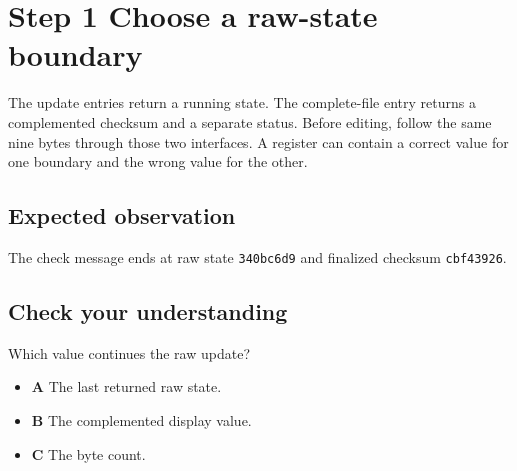 \section{Step 1 Choose a raw-state boundary}\label{crc-s01}

The update entries return a running state. The complete-file entry returns a complemented checksum and a separate status. Before editing, follow the same nine bytes through those two interfaces. A register can contain a correct value for one boundary and the wrong value for the other.

\subsection{Expected observation}
The check message ends at raw state \texttt{340bc6d9} and finalized checksum \texttt{cbf43926}.

\subsection{Check your understanding}
Which value continues the raw update?

\begin{itemize}
  \item \textbf{A} The last returned raw state.
  \item \textbf{B} The complemented display value.
  \item \textbf{C} The byte count.
\end{itemize}
